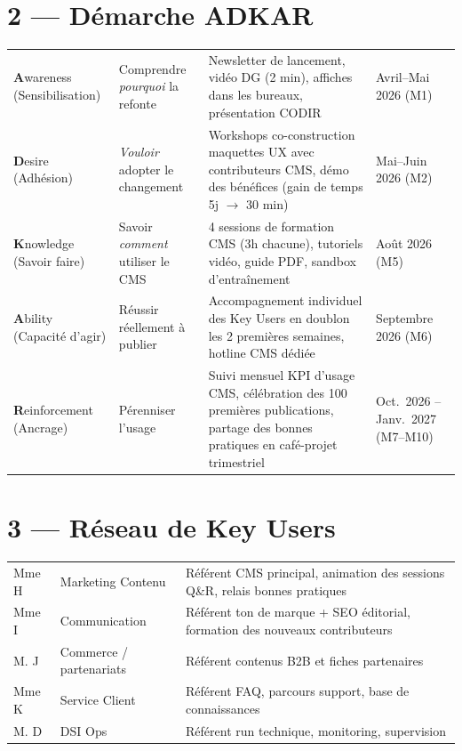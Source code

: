\documentclass[11pt,a4paper,oneside]{report}
\begin{document}
\section*{2 --- Démarche ADKAR}

\renewcommand{\arraystretch}{1.4}
\begin{tabularx}{\textwidth}{L{2.5cm} L{3.5cm} Y C{2cm}}
\toprule
{} &  &  &  \\
\midrule
\textbf{A}wareness (Sensibilisation) & Comprendre \textit{pourquoi} la refonte & Newsletter de lancement, vidéo DG (2 min), affiches dans les bureaux, présentation CODIR & Avril--Mai 2026 (M1) \\
\textbf{D}esire (Adhésion) & \textit{Vouloir} adopter le changement & Workshops co-construction maquettes UX avec contributeurs CMS, démo des bénéfices (gain de temps 5j $\rightarrow$ 30 min) & Mai--Juin 2026 (M2) \\
\textbf{K}nowledge (Savoir faire) & Savoir \textit{comment} utiliser le CMS & 4 sessions de formation CMS (3h chacune), tutoriels vidéo, guide PDF, sandbox d'entraînement & Août 2026 (M5) \\
\textbf{A}bility (Capacité d'agir) & Réussir réellement à publier & Accompagnement individuel des Key Users en doublon les 2 premières semaines, hotline CMS dédiée & Septembre 2026 (M6) \\
\textbf{R}einforcement (Ancrage) & Pérenniser l'usage & Suivi mensuel KPI d'usage CMS, célébration des 100 premières publications, partage des bonnes pratiques en café-projet trimestriel & Oct.\ 2026 -- Janv.\ 2027 (M7--M10) \\
\bottomrule
\end{tabularx}

\section*{3 --- Réseau de Key Users}

\renewcommand{\arraystretch}{1.3}
\begin{tabularx}{\textwidth}{L{4cm} L{3cm} Y}
\toprule
{} &  &  \\
\midrule
Mme H             & Marketing Contenu     & Référent CMS principal, animation des sessions Q\&R, relais bonnes pratiques \\
Mme I              & Communication        & Référent ton de marque + SEO éditorial, formation des nouveaux contributeurs \\
M. J              & Commerce / partenariats & Référent contenus B2B et fiches partenaires \\
Mme K               & Service Client       & Référent FAQ, parcours support, base de connaissances \\
M. D              & DSI Ops              & Référent run technique, monitoring, supervision \\
\bottomrule
\end{tabularx}
\end{document}
